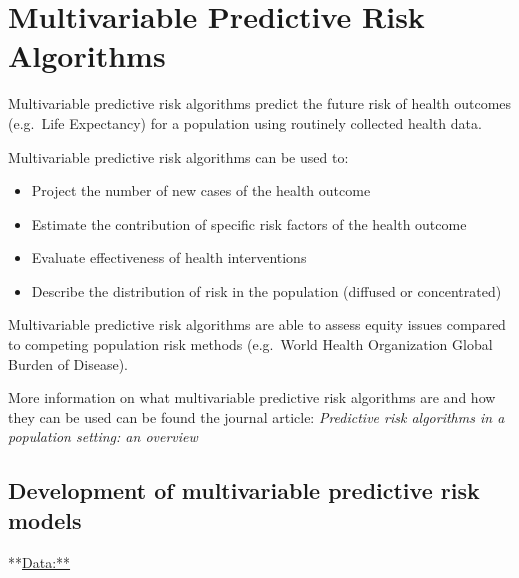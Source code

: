 \documentclass[]{book}
\providecommand{\tightlist}{%
  \setlength{\itemsep}{0pt}\setlength{\parskip}{0pt}}
\begin{document}
\section{Multivariable Predictive Risk
Algorithms}\label{multivariable-predictive-risk-algorithms}

Multivariable predictive risk algorithms predict the future risk of
health outcomes (e.g.~Life Expectancy) for a population using routinely
collected health data.

Multivariable predictive risk algorithms can be used to:

\begin{itemize}
\tightlist
\item
  Project the number of new cases of the health outcome
\item
  Estimate the contribution of specific risk factors of the health
  outcome
\item
  Evaluate effectiveness of health interventions
\item
  Describe the distribution of risk in the population (diffused or
  concentrated)
\end{itemize}

Multivariable predictive risk algorithms are able to assess equity
issues compared to competing population risk methods (e.g.~World Health
Organization Global Burden of Disease).

More information on what multivariable predictive risk algorithms are
and how they can be used can be found the journal article:
\emph{Predictive risk algorithms in a population setting: an overview}
\citep{PoRTover}

\subsection{Development of multivariable predictive risk
models}\label{development-of-multivariable-predictive-risk-models}

**\url{Data:**}
\end{document}
